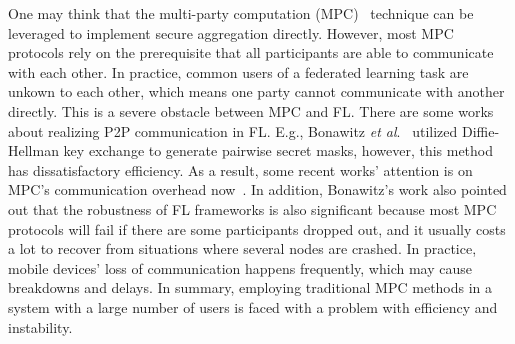 One may think that the multi-party computation (MPC)~\cite{Yao1982Protocols} technique can be leveraged to implement secure aggregation directly. However, most MPC protocols rely on the prerequisite that all participants are able to communicate with each other. In practice, common users of a federated learning task are unkown to each other, which means one party cannot communicate with another directly. This is a severe obstacle between MPC and FL. There are some works about realizing P2P communication in FL. E.g., Bonawitz \emph{et al}.~\cite{Practical} utilized Diffie-Hellman key exchange to generate pairwise secret masks, however, this method has dissatisfactory efficiency. As a result, some recent works' attention is on MPC's communication overhead now~\cite{Weighted,Two-Phase}. In addition, Bonawitz's work also pointed out that the robustness of FL frameworks is also significant because most MPC protocols will fail if there are some participants dropped out, and it usually costs a lot to recover from situations where several nodes are crashed. In practice, mobile devices' loss of communication happens frequently, which may cause breakdowns and delays. In summary, employing traditional MPC methods in a system with a large number of users is faced with a problem with efficiency and instability.


